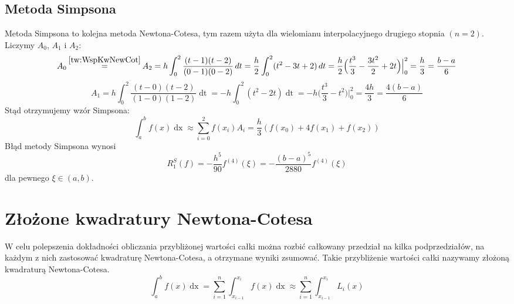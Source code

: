 \documentclass[11pt,wide]{article}
\newcommand\numeq[1]%
  {\stackrel{\scriptscriptstyle \mkern-1.5mu#1\mkern-1.5mu }{=}}
\begin{document}
\subsection{Metoda Simpsona}
Metoda Simpsona to kolejna metoda Newtona-Cotesa, tym razem użyta dla wielomianu interpolacyjnego drugiego stopnia \((n = 2)\). Liczymy \(A_0\), \(A_1\) i \(A_2\):
\begin{equation}
A_0 \numeq{\eqref{tw:WspKwNewCot}} A_2 = h \int_0^2 \frac{(t-1)(t-2)}{(0-1)(0-2)} \mathop{dt} = \frac{h}{2} \int_0^2 (t^2-3t+2) \mathop{dt} = \frac{h}{2} \Big(\frac{t^3}{3} - \frac{3t^2}{2} + 2t\Big)\Big|_{0}^{2} = \frac{h}{3} = \frac{b-a}{6}
\end{equation}
\begin{equation}
A_1 = h \int_0^2 \frac{(t-0)(t-2)}{(1-0)(1-2)} \mathop{dt} = -h \int_0^2 (t^2-2t) \mathop{dt} = -h \Big(\frac{t^3}{3} - t^2\Big)\Big|_{0}^{2} = \frac{4h}{3} = \frac{4(b-a)}{6}
\end{equation}
Stąd otrzymujemy wzór Simpsona:
\begin{equation} \label{wzor:WzorSimpsona}
\int_a^b f(x)\mathop{dx} \approx \sum_{i=0}^2 f(x_i) A_i = \frac{h}{3} (f(x_0) + 4f(x_1) + f(x_2))
\end{equation}
Błąd metody Simpsona wynosi
\begin{equation} \label{wzor:BladSimpsona}
R_1^S(f) = - \frac{h^5}{90}f^{(4)}(\xi) = - \frac{(b-a)^5}{2880}f^{(4)}(\xi)
\end{equation}
dla pewnego \(\xi \in (a, b)\).

\section{Złożone kwadratury Newtona-Cotesa}
W celu polepszenia dokładności obliczania przybliżonej wartości całki można rozbić całkowany przedział na kilka podprzedziałów, na każdym z nich zastosować kwadraturę Newtona-Cotesa, a otrzymane wyniki zsumować. Takie przybliżenie wartości całki nazywamy złożoną kwadraturą Newtona-Cotesa.
\begin{equation}
\int_a^b f(x)\mathop{dx} = \sum_{i=1}^n \int_{x_{i-1}}^{x_i}  f(x) \mathop{dx} \approx \sum_{i=1}^n \int_{x_{i-1}}^{x_i} L_i(x) 
\end{equation}
\end{document}

